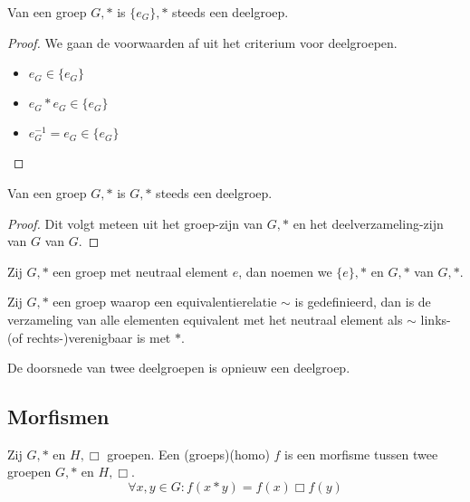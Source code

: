 \documentclass[main.tex]{subfiles}
\begin{document}
\begin{ei}
  Van een groep $G,*$ is $\{e_{G}\},*$ steeds een deelgroep.

  \begin{proof}
    We gaan de voorwaarden af uit het criterium voor deelgroepen.
    \begin{itemize}
    \item $e_{G} \in \{e_{G}\}$
    \item $e_{G} * e_{G} \in \{e_{G}\}$
    \item $e_{G}^{-1} = e_{G} \in \{e_{G}\}$
    \end{itemize}
  \end{proof}
\end{ei}

\begin{ei}
  Van een groep $G,*$ is $G,*$ steeds een deelgroep.
  
  \begin{proof}
    Dit volgt meteen uit het groep-zijn van $G,*$ en het deelverzameling-zijn van $G$ van $G$.
  \end{proof}
\end{ei}

\begin{de}
  Zij $G,*$ een groep met neutraal element $e$, dan noemen we $\{e\},*$ en $G,*$  van $G,*$.
\end{de}


\begin{st}
  Zij $G,*$ een groep waarop een equivalentierelatie $\sim$ is gedefinieerd, dan is de verzameling van alle elementen equivalent met het neutraal element als $\sim$ links-(of rechts-)verenigbaar is met $*$.
  
\end{st}

\begin{st}
  \label{st:doorsnede-deelgroepen}
  De doorsnede van twee deelgroepen is opnieuw een deelgroep.
\end{st}

\subsection{Morfismen}
\label{sec:morfismen}

\begin{de}
  \label{de:groepsmorfisme}
  Zij $G,*$ en $H,\Box$ groepen.
  Een (groeps)(homo) $f$ is een morfisme tussen twee groepen $G,*$ en $H,\Box$.
  \[ \forall x,y \in G: f(x*y) = f(x) \Box f(y) \]
\end{de}
\end{document}
